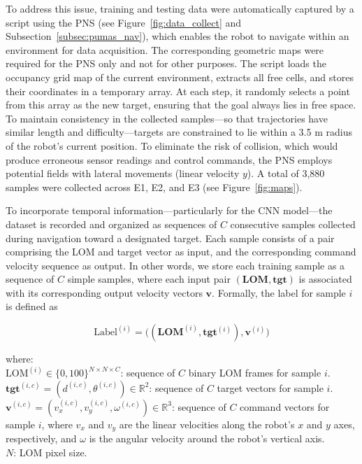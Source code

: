 \documentclass[robotics,article,submit,pdftex,moreauthors]{Definitions/mdpi}
\begin{document}
To address this issue, training and testing data were automatically captured by a script using the PNS (see Figure~\ref{fig:data_collect} and Subsection~\ref{subsec:pumas_nav}), which enables the robot to navigate within an environment for data acquisition. The corresponding geometric maps were required for the PNS only and not for other purposes. The script loads the occupancy grid map of the current environment, extracts all free cells, and stores their coordinates in a temporary array. At each step, it randomly selects a point from this array as the new target, ensuring that the goal always lies in free space. To maintain consistency in the collected samples—so that trajectories have similar length and difficulty—targets are constrained to lie within a 3.5 m radius of the robot’s current position. To eliminate the risk of collision, which would produce erroneous sensor readings and control commands, the PNS employs potential fields with lateral movements (linear velocity $y$). A total of 3,880 samples were collected across E1, E2, and E3 (see Figure~\ref{fig:maps}).

To incorporate temporal information—particularly for the CNN model—the dataset is recorded and organized as sequences of $C$ consecutive samples collected during navigation toward a designated target. Each sample consists of a pair comprising the LOM and target vector as input, and the corresponding command velocity sequence as output. In other words, we store each training sample as a sequence of $C$ simple samples, where each input pair $(\mathbf{LOM}, \mathbf{tgt})$ is associated with its corresponding output velocity vectors $\mathbf{v}$. Formally, the label for sample $i$ is defined as

\begin{equation}
\text{Label}^{(i)} = \big((\mathbf{LOM}^{(i)}, \mathbf{tgt}^{(i)}), \mathbf{v}^{(i)}\big)
\label{train_labels}
\end{equation}

where:\\
$\text{LOM}^{(i)} \in \{0, 100\}^{N \times N \times C}$: sequence of $C$ binary LOM frames for sample $i$.\\
$\mathbf{tgt}^{(i,c)} = (d^{(i,c)}, \theta^{(i,c)}) \in \mathbb{R}^{2}$: sequence of $C$ target vectors for sample $i$.\\
$\mathbf{v}^{(i,c)} = (v_x^{(i,c)}, v_y^{(i,c)}, \omega^{(i,c)}) \in \mathbb{R}^{3}$: sequence of $C$ command vectors for sample $i$, where $v_x$ and $v_y$ are the linear velocities along the robot's $x$ and $y$ axes, respectively, and $\omega$ is the angular velocity around the robot's vertical axis.\\
$N$: LOM pixel size.
\end{document}
